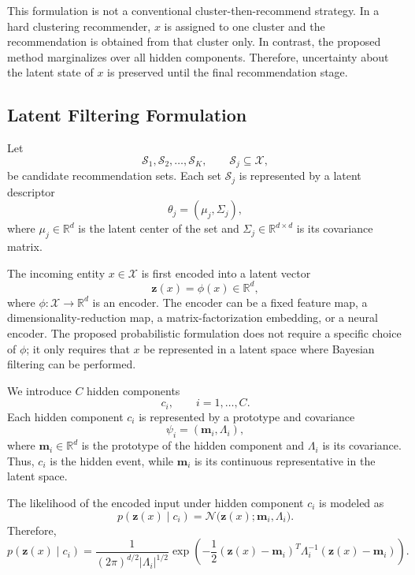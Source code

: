 \documentclass{article}
\theoremstyle{plain}
\theoremstyle{definition}
\theoremstyle{remark}
\begin{document}
This formulation is not a conventional cluster-then-recommend strategy. In a hard clustering recommender, \(x\) is assigned to one cluster and the recommendation is obtained from that cluster only. In contrast, the proposed method marginalizes over all hidden components. Therefore, uncertainty about the latent state of \(x\) is preserved until the final recommendation stage.

\subsection{Latent Filtering Formulation}
\label{subsec:latent_filtering}

Let
\[
\mathcal S_1,\mathcal S_2,\ldots,\mathcal S_K,
\qquad
\mathcal S_j\subseteq \mathcal X,
\]
be candidate recommendation sets. Each set \(\mathcal S_j\) is represented by a latent descriptor
\[
\theta_j=(\mu_j,\Sigma_j),
\]
where \(\mu_j\in\mathbb R^d\) is the latent center of the set and \(\Sigma_j\in\mathbb R^{d\times d}\) is its covariance matrix.

The incoming entity \(x\in\mathcal X\) is first encoded into a latent vector
\[
\mathbf z(x)=\phi(x)\in\mathbb R^d,
\]
where \(\phi:\mathcal X\rightarrow\mathbb R^d\) is an encoder. The encoder can be a fixed feature map, a dimensionality-reduction map, a matrix-factorization embedding, or a neural encoder. The proposed probabilistic formulation does not require a specific choice of \(\phi\); it only requires that \(x\) be represented in a latent space where Bayesian filtering can be performed.

We introduce \(C\) hidden components
\[
c_i,\qquad i=1,\ldots,C.
\]
Each hidden component \(c_i\) is represented by a prototype and covariance
\[
\psi_i=(\mathbf m_i,\Lambda_i),
\]
where \(\mathbf m_i\in\mathbb R^d\) is the prototype of the hidden component and \(\Lambda_i\) is its covariance. Thus, \(c_i\) is the hidden event, while \(\mathbf m_i\) is its continuous representative in the latent space.

The likelihood of the encoded input under hidden component \(c_i\) is modeled as
\[
p(\mathbf z(x)\mid c_i)
=
\mathcal N\big(\mathbf z(x);\mathbf m_i,\Lambda_i\big).
\]
Therefore,
\begin{equation}
	\label{eq:latent_likelihood}
	p(\mathbf z(x)\mid c_i)
	=
	\frac{1}{(2\pi)^{d/2}|\Lambda_i|^{1/2}}
	\exp\left(
	-\frac{1}{2}
	(\mathbf z(x)-\mathbf m_i)^T
	\Lambda_i^{-1}
	(\mathbf z(x)-\mathbf m_i)
	\right).
\end{equation}
\end{document}
